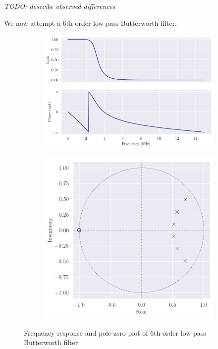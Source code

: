 \textit{TODO: describe observed differences}

\newpage

We now attempt a 6th-order low pass Butterworth filter.

\begin{figure}[ht]
    \centering
    \begin{subfigure}[b]{0.58\textwidth}
        \centering
        \includegraphics[width=\textwidth]{images/q8_6th_freqz.png}
    \end{subfigure}
    \hfill
    \begin{subfigure}[b]{0.41\textwidth}
        \centering
        \includegraphics[width=\textwidth]{images/q8_6th_zp.png}
    \end{subfigure}
    \caption{Frequency response and pole-zero plot of 6th-order low pass Butterworth filter}
\end{figure}

